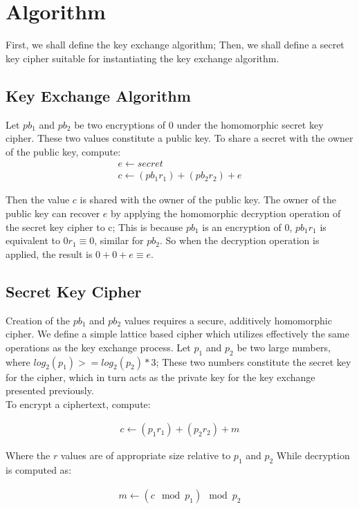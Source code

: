 \documentclass[preprint]{iacrtrans}
\begin{document}
\section{Algorithm}
First, we shall define the key exchange algorithm; Then, we shall define a secret key cipher suitable for instantiating the key exchange algorithm.

\subsection{Key Exchange Algorithm}
Let $pb_1$ and $pb_2$ be two encryptions of $0$ under the homomorphic secret key cipher. These two values constitute a public key. To share a secret with the owner of the public key, compute:
\begin{align}
    e \gets secret \\
    c \gets (pb_1  r_1) + (pb_2 r_2) + e
\end{align}

Then the value $c$ is shared with the owner of the public key. The owner of the public key can recover $e$ by applying the homomorphic decryption operation of the secret key cipher to c; This is because $pb_1$ is an encryption of $0$, $pb_1 r_1$ is equivalent to $0 r_1 \equiv 0$, similar for $pb_2$. So when the decryption operation is applied, the result is $0 + 0 + e \equiv e$.

\subsection{Secret Key Cipher}
Creation of the $pb_1$ and $pb_2$ values requires a secure, additively homomorphic cipher. We define a simple lattice based cipher which utilizes effectively the same operations as the key exchange process. Let $p_1$ and $p_2$ be two large numbers, where $log_2(p_1) >= log_2(p_2) * 3$; These two numbers constitute the secret key for the cipher, which in turn acts as the private key for the key exchange presented previously.\\

To encrypt a ciphertext, compute:

\begin{align}
   c \gets (p_1 r_1) + (p_2 r_2) + m
\end{align}

Where the $r$ values are of appropriate size relative to $p_1$ and $p_2$ 
While decryption is computed as:

\begin{align}
    m \gets (c \mod p_1) \mod p_2
\end{align}
\end{document}
